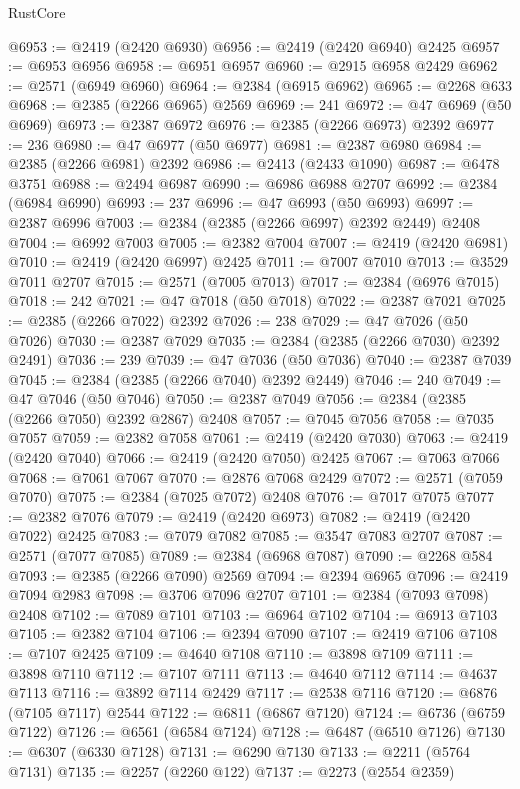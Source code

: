 \begin{lexlean}{RustCore}
\begin{coremodule}
@6953 := @2419 (@2420 @6930)
@6956 := @2419 (@2420 @6940) @2425
@6957 := @6953 @6956
@6958 := @6951 @6957
@6960 := @2915 @6958 @2429
@6962 := @2571 (@6949 @6960)
@6964 := @2384 (@6915 @6962)
@6965 := @2268 @633
@6968 := @2385 (@2266 @6965) @2569
@6969 := 241
@6972 := @47 @6969 (@50 @6969)
@6973 := @2387 @6972
@6976 := @2385 (@2266 @6973) @2392
@6977 := 236
@6980 := @47 @6977 (@50 @6977)
@6981 := @2387 @6980
@6984 := @2385 (@2266 @6981) @2392
@6986 := @2413 (@2433 @1090)
@6987 := @6478 @3751
@6988 := @2494 @6987
@6990 := @6986 @6988 @2707
@6992 := @2384 (@6984 @6990)
@6993 := 237
@6996 := @47 @6993 (@50 @6993)
@6997 := @2387 @6996
@7003 := @2384 (@2385 (@2266 @6997) @2392 @2449) @2408
@7004 := @6992 @7003
@7005 := @2382 @7004
@7007 := @2419 (@2420 @6981)
@7010 := @2419 (@2420 @6997) @2425
@7011 := @7007 @7010
@7013 := @3529 @7011 @2707
@7015 := @2571 (@7005 @7013)
@7017 := @2384 (@6976 @7015)
@7018 := 242
@7021 := @47 @7018 (@50 @7018)
@7022 := @2387 @7021
@7025 := @2385 (@2266 @7022) @2392
@7026 := 238
@7029 := @47 @7026 (@50 @7026)
@7030 := @2387 @7029
@7035 := @2384 (@2385 (@2266 @7030) @2392 @2491)
@7036 := 239
@7039 := @47 @7036 (@50 @7036)
@7040 := @2387 @7039
@7045 := @2384 (@2385 (@2266 @7040) @2392 @2449)
@7046 := 240
@7049 := @47 @7046 (@50 @7046)
@7050 := @2387 @7049
@7056 := @2384 (@2385 (@2266 @7050) @2392 @2867) @2408
@7057 := @7045 @7056
@7058 := @7035 @7057
@7059 := @2382 @7058
@7061 := @2419 (@2420 @7030)
@7063 := @2419 (@2420 @7040)
@7066 := @2419 (@2420 @7050) @2425
@7067 := @7063 @7066
@7068 := @7061 @7067
@7070 := @2876 @7068 @2429
@7072 := @2571 (@7059 @7070)
@7075 := @2384 (@7025 @7072) @2408
@7076 := @7017 @7075
@7077 := @2382 @7076
@7079 := @2419 (@2420 @6973)
@7082 := @2419 (@2420 @7022) @2425
@7083 := @7079 @7082
@7085 := @3547 @7083 @2707
@7087 := @2571 (@7077 @7085)
@7089 := @2384 (@6968 @7087)
@7090 := @2268 @584
@7093 := @2385 (@2266 @7090) @2569
@7094 := @2394 @6965
@7096 := @2419 @7094 @2983
@7098 := @3706 @7096 @2707
@7101 := @2384 (@7093 @7098) @2408
@7102 := @7089 @7101
@7103 := @6964 @7102
@7104 := @6913 @7103
@7105 := @2382 @7104
@7106 := @2394 @7090
@7107 := @2419 @7106
@7108 := @7107 @2425
@7109 := @4640 @7108
@7110 := @3898 @7109
@7111 := @3898 @7110
@7112 := @7107 @7111
@7113 := @4640 @7112
@7114 := @4637 @7113
@7116 := @3892 @7114 @2429
@7117 := @2538 @7116
@7120 := @6876 (@7105 @7117) @2544
@7122 := @6811 (@6867 @7120)
@7124 := @6736 (@6759 @7122)
@7126 := @6561 (@6584 @7124)
@7128 := @6487 (@6510 @7126)
@7130 := @6307 (@6330 @7128)
@7131 := @6290 @7130
@7133 := @2211 (@5764 @7131)
@7135 := @2257 (@2260 @122)
@7137 := @2273 (@2554 @2359)

\end{coremodule}
\end{lexlean}
